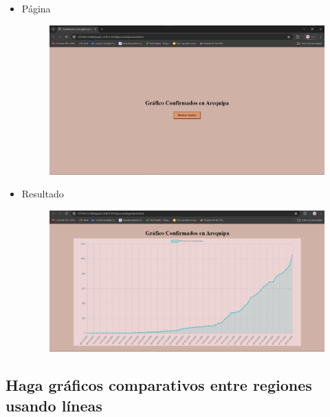 \documentclass{article}
\begin{document}
\begin{itemize}
\begin{figure}[H]
		\end{figure}
		\item Página
		\begin{figure}[H]
			\centering
			\includegraphics[width=1.0\textwidth,keepaspectratio]{img/Ejer4T2Pagina.jpg}
		\end{figure}
		\item Resultado
		\begin{figure}[H]
			\centering
			\includegraphics[width=1.0\textwidth,keepaspectratio]{img/Ejer4T2Result.jpg}
		\end{figure}
	\end{itemize}
	
	\subsection{Haga gráficos comparativos entre regiones usando líneas}
	
\end{document}
